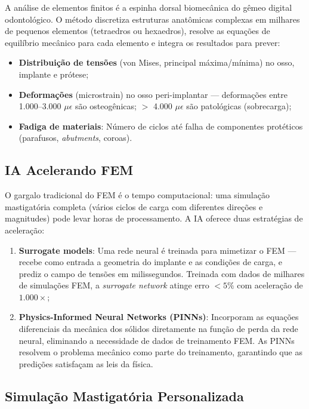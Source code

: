 A análise de elementos finitos é a espinha dorsal biomecânica do gêmeo digital odontológico. O método discretiza estruturas anatômicas complexas em milhares de pequenos elementos (tetraedros ou hexaedros), resolve as equações de equilíbrio mecânico para cada elemento e integra os resultados para prever:
\begin{itemize}
    \item \textbf{Distribuição de tensões} (von Mises, principal máxima/mínima) no osso, implante e prótese;
    \item \textbf{Deformações} (microstrain) no osso peri-implantar --- deformações entre 1.000--3.000 $\mu\epsilon$ são osteogênicas; $>$ 4.000 $\mu\epsilon$ são patológicas (sobrecarga);
    \item \textbf{Fadiga de materiais}: Número de ciclos até falha de componentes protéticos (parafusos, \textit{abutments}, coroas).
\end{itemize}

\subsection{IA Acelerando FEM}

O gargalo tradicional do FEM é o tempo computacional: uma simulação mastigatória completa (vários ciclos de carga com diferentes direções e magnitudes) pode levar horas de processamento. A IA oferece duas estratégias de aceleração:

\begin{enumerate}
    \item \textbf{Surrogate models}: Uma rede neural é treinada para mimetizar o FEM --- recebe como entrada a geometria do implante e as condições de carga, e prediz o campo de tensões em milissegundos. Treinada com dados de milhares de simulações FEM, a \textit{surrogate network} atinge erro $< 5\%$ com aceleração de $1.000\times$;
    
    \item \textbf{Physics-Informed Neural Networks (PINNs)}: Incorporam as equações diferenciais da mecânica dos sólidos diretamente na função de perda da rede neural, eliminando a necessidade de dados de treinamento FEM. As PINNs resolvem o problema mecânico como parte do treinamento, garantindo que as predições satisfaçam as leis da física.
\end{enumerate}

\subsection{Simulação Mastigatória Personalizada}

